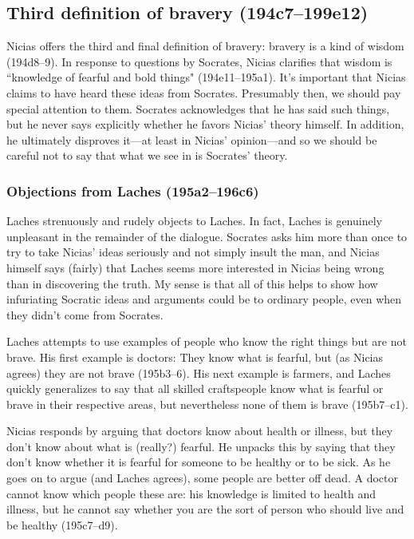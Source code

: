 \documentclass[11pt]{article}
\begin{document}

\subsection{Third definition of bravery (194c7--199e12)}

Nicias offers the third and final definition of bravery: bravery is a kind of wisdom (194d8--9).  In response to questions by Socrates, Nicias clarifies that wisdom is ``knowledge of fearful and bold things" (194e11--195a1).  It's important that Nicias claims to have heard these ideas from Socrates.  Presumably then, we should pay special attention to them.  Socrates acknowledges that he has said such things, but he never says explicitly whether he favors Nicias' theory himself.  In addition, he ultimately disproves it---at least in Nicias' opinion---and so we should be careful not to say that what we see in  is Socrates' theory.


\subsubsection{Objections from Laches (195a2--196c6)}

Laches strenuously and rudely objects to Laches.  In fact, Laches is genuinely unpleasant in the remainder of the dialogue.  Socrates asks him more than once to try to take Nicias' ideas seriously and not simply insult the man, and Nicias himself says (fairly) that Laches seems more interested in Nicias being wrong than in discovering the truth.  My sense is that all of this helps to show how infuriating Socratic ideas and arguments could be to ordinary people, even when they didn't come from Socrates.

Laches attempts to use examples of people who know the right things but are not brave.  His first example is doctors: They know what is fearful, but (as Nicias agrees) they are not brave (195b3--6).  His next example is farmers, and Laches quickly generalizes to say that all skilled craftspeople know what is fearful or brave in their respective areas, but nevertheless none of them is brave (195b7--c1).

Nicias responds by arguing that doctors know about health or illness, but they don't know about what is (really?) fearful.  He unpacks this by saying that they don't know whether it is fearful for someone to be healthy or to be sick.  As he goes on to argue (and Laches agrees), some people are better off dead.  A doctor cannot know which people these are: his knowledge is limited to health and illness, but he cannot say whether you are the sort of person who should live and be healthy (195c7--d9).
\end{document}
